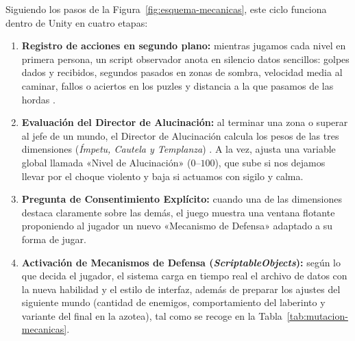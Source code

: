 Siguiendo los pasos de la Figura~\ref{fig:esquema-mecanicas}, este ciclo funciona dentro de Unity en cuatro etapas:

\begin{enumerate}
  \item \textbf{Registro de acciones en segundo plano:} mientras jugamos cada nivel en primera persona, un script observador anota en silencio datos sencillos: golpes dados y recibidos, segundos pasados en zonas de sombra, velocidad media al caminar, fallos o aciertos en los puzles y distancia a la que pasamos de las hordas \parencite{renderhub2023}.
  \item \textbf{Evaluación del Director de Alucinación:} al terminar una zona o superar al jefe de un mundo, el Director de Alucinación calcula los pesos de las tres dimensiones (\textit{Ímpetu, Cautela y Templanza}) \parencite{tremblay2010}. A la vez, ajusta una variable global llamada «Nivel de Alucinación» ($0$--$100$), que sube si nos dejamos llevar por el choque violento y baja si actuamos con sigilo y calma.
  \item \textbf{Pregunta de Consentimiento Explícito:} cuando una de las dimensiones destaca claramente sobre las demás, el juego muestra una ventana flotante proponiendo al jugador un nuevo «Mecanismo de Defensa» adaptado a su forma de jugar.
  \item \textbf{Activación de Mecanismos de Defensa (\textit{ScriptableObjects}):} según lo que decida el jugador, el sistema carga en tiempo real el archivo de datos con la nueva habilidad y el estilo de interfaz, además de preparar los ajustes del siguiente mundo (cantidad de enemigos, comportamiento del laberinto y variante del final en la azotea), tal como se recoge en la Tabla~\ref{tab:mutacion-mecanicas}.
\end{enumerate}


